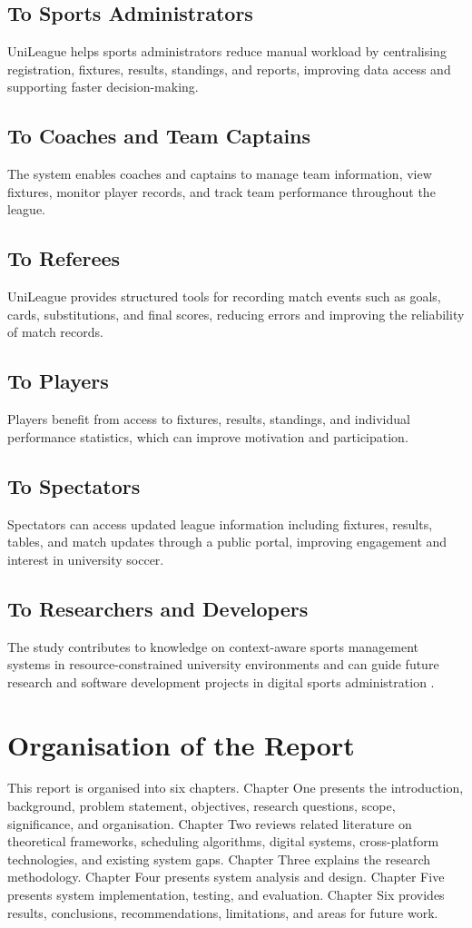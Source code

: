 \documentclass[12pt,a4paper]{report}
\begin{document}
\subsection{To Sports Administrators}
UniLeague helps sports administrators reduce manual workload by centralising registration,
fixtures, results, standings, and reports, improving data access and supporting faster
decision-making.

\subsection{To Coaches and Team Captains}
The system enables coaches and captains to manage team information, view fixtures, monitor
player records, and track team performance throughout the league.

\subsection{To Referees}
UniLeague provides structured tools for recording match events such as goals, cards,
substitutions, and final scores, reducing errors and improving the reliability of match records.

\subsection{To Players}
Players benefit from access to fixtures, results, standings, and individual performance
statistics, which can improve motivation and participation.

\subsection{To Spectators}
Spectators can access updated league information including fixtures, results, tables, and match
updates through a public portal, improving engagement and interest in university soccer.

\subsection{To Researchers and Developers}
The study contributes to knowledge on context-aware sports management systems in
resource-constrained university environments and can guide future research and software
development projects in digital sports administration \cite{vec2024}.

\section{Organisation of the Report}
This report is organised into six chapters. Chapter One presents the introduction, background,
problem statement, objectives, research questions, scope, significance, and organisation.
Chapter Two reviews related literature on theoretical frameworks, scheduling algorithms,
digital systems, cross-platform technologies, and existing system gaps. Chapter Three explains
the research methodology. Chapter Four presents system analysis and design. Chapter Five
presents system implementation, testing, and evaluation. Chapter Six provides results,
conclusions, recommendations, limitations, and areas for future work.
\end{document}
